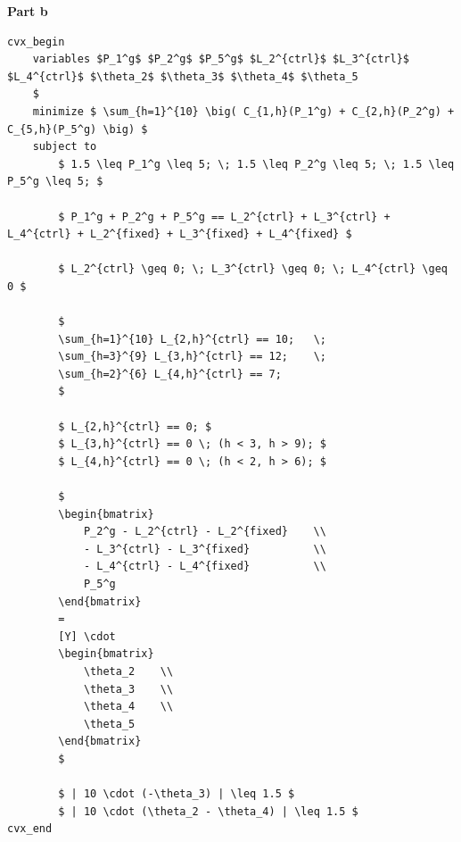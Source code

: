 \documentclass[11pt]{article}
\begin{document}
\noindent
\textbf{Part b} \\
\begin{lstlisting}
cvx_begin
    variables $P_1^g$ $P_2^g$ $P_5^g$ $L_2^{ctrl}$ $L_3^{ctrl}$ $L_4^{ctrl}$ $\theta_2$ $\theta_3$ $\theta_4$ $\theta_5
    $
    minimize $ \sum_{h=1}^{10} \big( C_{1,h}(P_1^g) + C_{2,h}(P_2^g) + C_{5,h}(P_5^g) \big) $
    subject to
        $ 1.5 \leq P_1^g \leq 5; \; 1.5 \leq P_2^g \leq 5; \; 1.5 \leq P_5^g \leq 5; $

        $ P_1^g + P_2^g + P_5^g == L_2^{ctrl} + L_3^{ctrl} + L_4^{ctrl} + L_2^{fixed} + L_3^{fixed} + L_4^{fixed} $

        $ L_2^{ctrl} \geq 0; \; L_3^{ctrl} \geq 0; \; L_4^{ctrl} \geq 0 $

        $
        \sum_{h=1}^{10} L_{2,h}^{ctrl} == 10;   \;
        \sum_{h=3}^{9} L_{3,h}^{ctrl} == 12;    \;
        \sum_{h=2}^{6} L_{4,h}^{ctrl} == 7;
        $

        $ L_{2,h}^{ctrl} == 0; $
        $ L_{3,h}^{ctrl} == 0 \; (h < 3, h > 9); $
        $ L_{4,h}^{ctrl} == 0 \; (h < 2, h > 6); $
        
        $
        \begin{bmatrix}
            P_2^g - L_2^{ctrl} - L_2^{fixed}    \\
            - L_3^{ctrl} - L_3^{fixed}          \\
            - L_4^{ctrl} - L_4^{fixed}          \\
            P_5^g                       
        \end{bmatrix}
        =
        [Y] \cdot
        \begin{bmatrix}
            \theta_2    \\
            \theta_3    \\
            \theta_4    \\
            \theta_5
        \end{bmatrix}
        $

        $ | 10 \cdot (-\theta_3) | \leq 1.5 $
        $ | 10 \cdot (\theta_2 - \theta_4) | \leq 1.5 $
cvx_end
\end{lstlisting}
\end{document}
